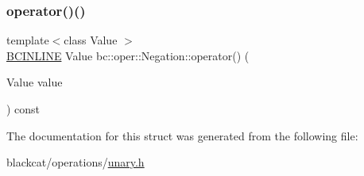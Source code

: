 \mbox{\label{structbc_1_1oper_1_1Negation_aa1e7024b5a8b85dd21d28118fc4ac40c}} 
\subsubsection{\texorpdfstring{operator()()}{operator()()}}
{\footnotesize\ttfamily template$<$class Value $>$ \\
\hyperlink{common_8h_a6699e8b0449da5c0fafb878e59c1d4b1}{B\+C\+I\+N\+L\+I\+NE} Value bc\+::oper\+::\+Negation\+::operator() (\begin{DoxyParamCaption}\item[{Value}]{value }\end{DoxyParamCaption}) const\hspace{0.3cm}{\ttfamily [inline]}}



The documentation for this struct was generated from the following file\+:\begin{DoxyCompactItemize}
\item 
blackcat/operations/\hyperlink{unary_8h}{unary.\+h}\end{DoxyCompactItemize}
